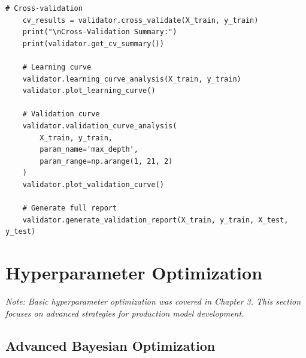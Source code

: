 \begin{lstlisting}[style=python, caption={Production Model Validation Framework}]
    # Cross-validation
    cv_results = validator.cross_validate(X_train, y_train)
    print("\nCross-Validation Summary:")
    print(validator.get_cv_summary())

    # Learning curve
    validator.learning_curve_analysis(X_train, y_train)
    validator.plot_learning_curve()

    # Validation curve
    validator.validation_curve_analysis(
        X_train, y_train,
        param_name='max_depth',
        param_range=np.arange(1, 21, 2)
    )
    validator.plot_validation_curve()

    # Generate full report
    validator.generate_validation_report(X_train, y_train, X_test, y_test)
\end{lstlisting}

\section{Hyperparameter Optimization}

\textit{Note: Basic hyperparameter optimization was covered in Chapter 3. This section focuses on advanced strategies for production model development.}

\subsection{Advanced Bayesian Optimization}

